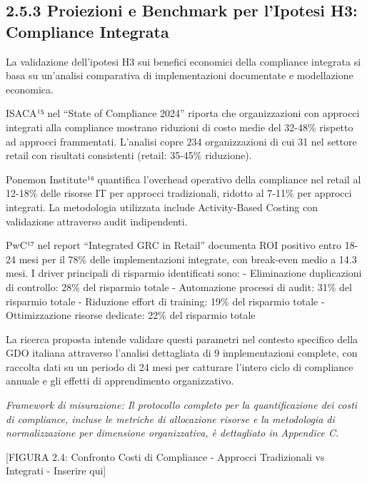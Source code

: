 \documentclass[12pt,a4paper,oneside]{book}
\numberwithin{figure}{chapter} %
\numberwithin{table}{chapter}  %
\begin{document}
\subsection{2.5.3 Proiezioni e Benchmark per l'Ipotesi H3: Compliance
Integrata}\label{proiezioni-e-benchmark-per-lipotesi-h3-compliance-integrata}

La validazione dell'ipotesi H3 sui benefici economici della compliance
integrata si basa su un'analisi comparativa di implementazioni
documentate e modellazione economica.

ISACA¹⁵ nel ``State of Compliance 2024'' riporta che organizzazioni con
approcci integrati alla compliance mostrano riduzioni di costo medie del
32-48\% rispetto ad approcci frammentati. L'analisi copre 234
organizzazioni di cui 31 nel settore retail con risultati consistenti
(retail: 35-45\% riduzione).

Ponemon Institute¹⁶ quantifica l'overhead operativo della compliance nel
retail al 12-18\% delle risorse IT per approcci tradizionali, ridotto al
7-11\% per approcci integrati. La metodologia utilizzata include
Activity-Based Costing con validazione attraverso audit indipendenti.

PwC¹⁷ nel report ``Integrated GRC in Retail'' documenta ROI positivo
entro 18-24 mesi per il 78\% delle implementazioni integrate, con
break-even medio a 14.3 mesi. I driver principali di risparmio
identificati sono: - Eliminazione duplicazioni di controllo: 28\% del
risparmio totale - Automazione processi di audit: 31\% del risparmio
totale - Riduzione effort di training: 19\% del risparmio totale -
Ottimizzazione risorse dedicate: 22\% del risparmio totale

La ricerca proposta intende validare questi parametri nel contesto
specifico della GDO italiana attraverso l'analisi dettagliata di 9
implementazioni complete, con raccolta dati su un periodo di 24 mesi per
catturare l'intero ciclo di compliance annuale e gli effetti di
apprendimento organizzativo.

\emph{Framework di misurazione: Il protocollo completo per la
quantificazione dei costi di compliance, incluse le metriche di
allocazione risorse e la metodologia di normalizzazione per dimensione
organizzativa, è dettagliato in Appendice C.}

{[}FIGURA 2.4: Confronto Costi di Compliance - Approcci Tradizionali vs
Integrati - Inserire qui{]}
\end{document}
